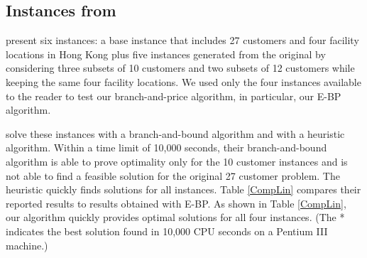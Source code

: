 \documentclass[11pt]{article}
\begin{document}
\subsection{Instances from \citet{Lin}}
\label{compareLin}
\citet{Lin} present six instances: a base instance that includes
27 customers and four facility locations in Hong Kong plus five instances
generated from the original by considering three subsets of 10 customers and two subsets 
of 12 customers while keeping the same four facility locations. We used only
the four instances available to the reader to test our branch-and-price algorithm,
in particular, our E-BP algorithm.

\citet{Lin} solve these instances with a branch-and-bound algorithm
and with a heuristic algorithm.  Within a time limit of 10,000 seconds, their
branch-and-bound algorithm is able to prove optimality only for the 10 customer 
instances and is not able to find a feasible solution for the original 27 customer problem.
The heuristic quickly finds solutions for all instances.
Table \ref{CompLin} compares their reported results 
to results obtained with E-BP. As shown in Table \ref{CompLin},
our algorithm quickly provides optimal solutions for all four instances.  (The * indicates
the best solution found in 10,000 CPU seconds on a Pentium III machine.)

\begin{table}[h!tbp]
  \begin{center} 
  \caption{Comparison of \citet{Lin} results and branch-and-price results} \label{CompLin}
\end{center}
\end{table}
\end{document}
